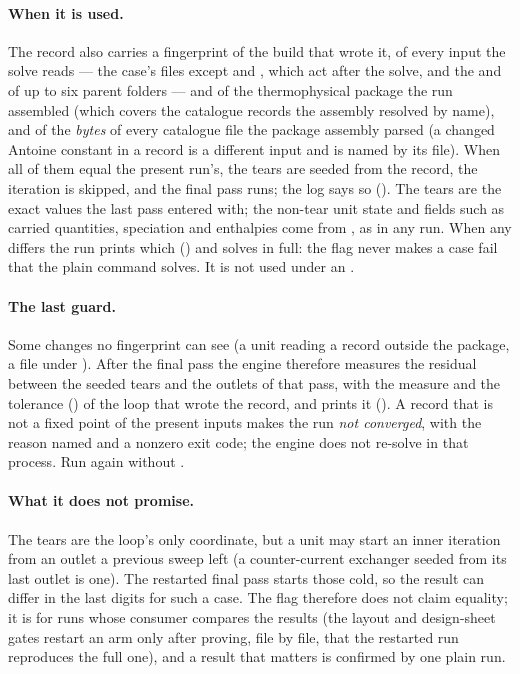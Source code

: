 \documentclass[11pt,a4paper]{article}
\begin{document}
\paragraph{When it is used.}  The record also carries a fingerprint of the
build that wrote it, of every input the solve reads --- the case's files
except  and , which act after
the solve, and the  and  of up to six parent
folders --- and of the thermophysical package the run assembled (which
covers the catalogue records the assembly resolved by name), and of the
\emph{bytes} of every catalogue file the package assembly parsed (a changed
Antoine constant in a record is a different input and is named by its file).
When all of them equal the present run's, the tears are seeded from the
record, the iteration is skipped, and the final pass runs; the log says so
().  The tears are the
exact values the last pass entered with; the non-tear unit state and fields
such as carried quantities, speciation and enthalpies come from , as
in any run.  When any differs the run
prints which () and solves in full: the flag never makes a case fail
that the plain command solves.  It is not used under an .

\paragraph{The last guard.}  Some changes no fingerprint can see (a unit
reading a record outside the package, a file under ).  After
the final pass the engine therefore measures the residual between the seeded
tears and the outlets of that pass, with the measure and the tolerance
() of the loop that wrote the record, and prints it
().  A record that is not a fixed point of
the present inputs makes the run \emph{not converged}, with the reason named
and a nonzero exit code; the engine does not re-solve in that process.  Run
again without .

\paragraph{What it does not promise.}  The tears are the loop's only
coordinate, but a unit may start an inner iteration from an outlet a previous
sweep left (a counter-current exchanger seeded from its last outlet is one).
The restarted final pass starts those cold, so the result can differ in the
last digits for such a case.  The flag therefore does not claim equality; it
is for runs whose consumer compares the results (the layout and design-sheet
gates restart an arm only after proving, file by file, that the restarted
run reproduces the full one), and a result that matters is confirmed by one
plain run.
\end{document}

